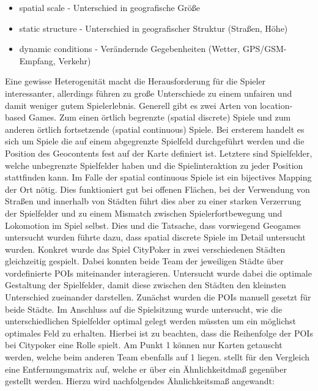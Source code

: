 \begin{itemize}
      \item spatial scale - Unterschied in geografische Größe
      \item static structure - Unterschied in geografischer Struktur (Straßen, Höhe) 
      \item dynamic conditions - Verändernde Gegebenheiten (Wetter, GPS/GSM-Empfang, Verkehr)
\end{itemize}

Eine gewisse Heterogenität macht die Herausforderung für die Spieler interessanter, allerdings führen zu große Unterschiede zu einem unfairen und damit weniger gutem Spielerlebnis.
Generell gibt es zwei Arten von location-based Games. Zum einen örtlich begrenzte (spatial discrete) Spiele und zum anderen örtlich fortsetzende (spatial
continuous) Spiele.
Bei ersterem handelt es sich um Spiele die auf einem abgegrenzte Spielfeld durchgeführt werden und die Position des Geocontents fest auf der Karte definiert ist. Letztere sind Spielfelder, welche unbegrenzte Spielfelder haben und die Spielinteraktion zu jeder Position stattfinden kann.
Im Falle der spatial continuous Spiele ist ein bijectives Mapping der Ort nötig. Dies funktioniert gut bei offenen Flächen, bei der Verwendung von Straßen und innerhalb von Städten führt dies aber zu einer starken Verzerrung der Spielfelder und zu einem Mismatch zwischen Spielerfortbewegung und Lokomotion im Spiel selbst.
Dies und die Tatsache, dass vorwiegend Geogames untersucht wurden führte dazu, dass  spatial discrete Spiele im Detail untersucht wurden.
Konkret wurde das Spiel CityPoker\cite{Kiefer.2005b} in zwei verschiedenen Städten gleichzeitig gespielt. Dabei konnten beide Team der jeweiligen Städte über vordefinierte POIs miteinander interagieren. Untersucht wurde dabei die optimale Gestaltung der Spielfelder, damit diese zwischen den Städten den kleinsten Unterschied zueinander darstellen. Zunächst wurden die POIs manuell gesetzt für beide Städte. Im Anschluss auf die Spielsitzung wurde untersucht, wie die unterschiedlichen Spielfelder optimal gelegt werden müssten um ein möglichst optimales Feld zu erhalten. Hierbei ist zu beachten, dass die Reihenfolge der POIs bei Citypoker eine Rolle spielt. Am Punkt 1 können nur Karten getauscht werden, welche beim anderen Team ebenfalls auf 1 liegen.  \cite{Kiefer.2007} stellt für den Vergleich eine Entfernungsmatrix auf, welche er über ein Ähnlichkeitdmaß gegenüber gestellt werden.
Hierzu wird nachfolgendes Ähnlichkeitsmaß angewandt:

